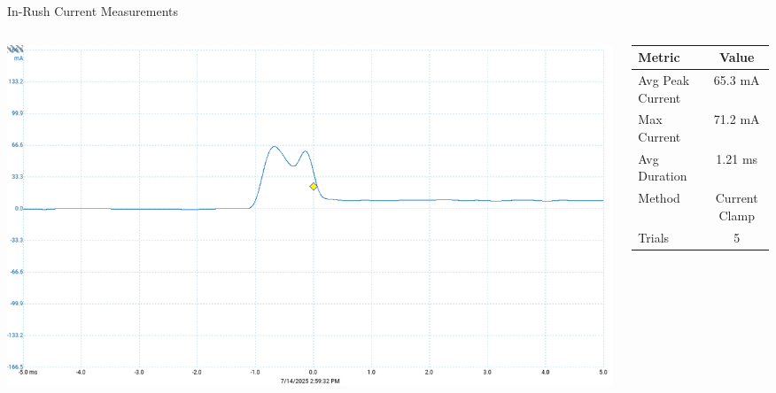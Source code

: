 \begin{frame}{In-Rush Current Measurements}
\begin{columns}

    \begin{column}{0.5\textwidth}
        \centering
        \includegraphics[width=\linewidth]{images/inrush_1core_baseline.png}
    \end{column}

    \begin{column}{0.5\textwidth}
        \centering
        \begin{tabular}{|l|c|}
            \hline
            \textbf{Metric} & \textbf{Value} \\
            \hline
            Avg Peak Current & 65.3 mA \\
            Max Current      & 71.2 mA \\
            Avg Duration     & 1.21 ms \\
            Method           & Current Clamp \\
            Trials           & 5 \\
            \hline
        \end{tabular}
    \end{column}

\end{columns}
\end{frame}

